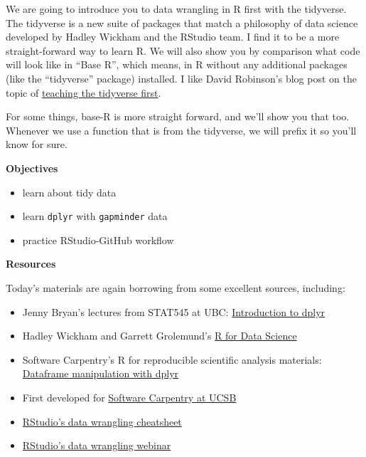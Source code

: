 \documentclass[]{book}
\providecommand{\tightlist}{%
  \setlength{\itemsep}{0pt}\setlength{\parskip}{0pt}}
\theoremstyle{definition}
\theoremstyle{definition}
\theoremstyle{definition}
\theoremstyle{remark}
\begin{document}
We are going to introduce you to data wrangling in R first with the
tidyverse. The tidyverse is a new suite of packages that match a
philosophy of data science developed by Hadley Wickham and the RStudio
team. I find it to be a more straight-forward way to learn R. We will
also show you by comparison what code will look like in ``Base R'',
which means, in R without any additional packages (like the
``tidyverse'' package) installed. I like David Robinson's blog post on
the topic of
\href{http://varianceexplained.org/r/teach-hard-way}{teaching the
tidyverse first}.

For some things, base-R is more straight forward, and we'll show you
that too. Whenever we use a function that is from the tidyverse, we will
prefix it so you'll know for sure.

\textbf{Objectives}

\begin{itemize}
\tightlist
\item
  learn about tidy data
\item
  learn \texttt{dplyr} with \texttt{gapminder} data
\item
  practice RStudio-GitHub workflow
\end{itemize}

\textbf{Resources}

Today's materials are again borrowing from some excellent sources,
including:

\begin{itemize}
\tightlist
\item
  Jenny Bryan's lectures from STAT545 at UBC:
  \href{http://stat545.com/block009_dplyr-intro.html}{Introduction to
  dplyr}
\item
  Hadley Wickham and Garrett Grolemund's \href{http://r4ds.had.co.nz/}{R
  for Data Science}
\item
  Software Carpentry's R for reproducible scientific analysis materials:
  \href{http://swcarpentry.github.io/r-novice-gapminder/13-dplyr.html}{Dataframe
  manipulation with dplyr}
\item
  First developed for
  \href{http://remi-daigle.github.io/2016-04-15-UCSB/dplyr/}{Software
  Carpentry at UCSB}
\item
  \href{http://www.rstudio.com/wp-content/uploads/2015/02/data-wrangling-cheatsheet.pdf}{RStudio's
  data wrangling cheatsheet}
\item
  \href{https://www.rstudio.com/resources/webinars/data-wrangling-with-r-and-rstudio/}{RStudio's
  data wrangling webinar}
\end{itemize}
\end{document}
